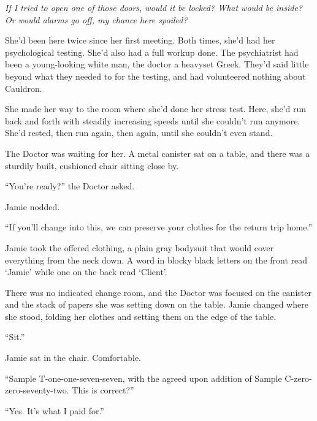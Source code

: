 \emph{If I tried to open one of those doors, would it be locked?  What would be inside?  Or would alarms go off, my chance here spoiled?}



She'd been here twice since her first meeting.  Both times, she'd had her psychological testing.  She'd also had a full workup done.  The psychiatrist had been a young-looking white man, the doctor a heavyset Greek.  They'd said little beyond what they needed to for the testing, and had volunteered nothing about Cauldron.



She made her way to the room where she'd done her stress test.  Here, she'd run back and forth with steadily increasing speeds until she couldn't run anymore.  She'd rested, then run again, then again, until she couldn't even stand.



The Doctor was waiting for her.  A metal canister sat on a table, and there was a sturdily built, cushioned chair sitting close by.



``You're ready?'' the Doctor asked.



Jamie nodded.



``If you'll change into this, we can preserve your clothes for the return trip home.''



Jamie took the offered clothing, a plain gray bodysuit that would cover everything from the neck down.  A word in blocky black letters on the front read `Jamie' while one on the back read `Client'.



There was no indicated change room, and the Doctor was focused on the canister and the stack of papers she was setting down on the table.  Jamie changed where she stood, folding her clothes and setting them on the edge of the table.



``Sit.''



Jamie sat in the chair.  Comfortable.



``Sample T-one-one-seven-seven, with the agreed upon addition of Sample C-zero-zero-seventy-two.  This is correct?''



``Yes.  It's what I paid for.''



